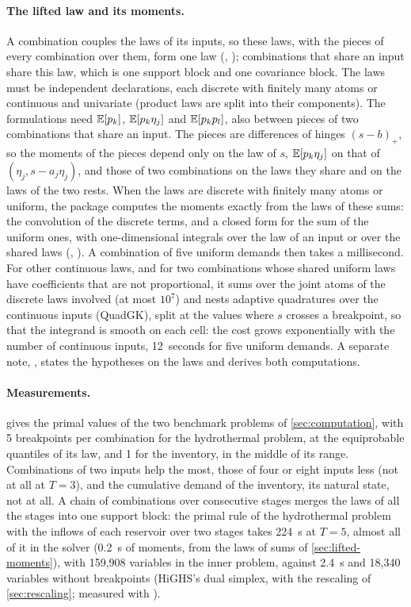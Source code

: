 \paragraph{The lifted law and its moments.}
A combination couples the laws of its inputs, so these laws, with the pieces of every combination over them, form one law
(, );
combinations that share an input share this law, which is one support block and one covariance block.
The laws must be independent declarations, each discrete with finitely many atoms or continuous and univariate (product laws are split into their components).
The formulations need $\mathbb{E}[p_k]$, $\mathbb{E}[p_k\eta_j]$ and $\mathbb{E}[p_kp_l]$, also between pieces of two combinations that share an input.
The pieces are differences of hinges $(s - b)_+$, so the moments of the pieces depend only on the law of $s$,
$\mathbb{E}[p_k\eta_j]$ on that of $(\eta_j, s - a_j\eta_j)$, and those of two combinations on the laws they share and on the laws of the two rests.
When the laws are discrete with finitely many atoms or uniform, the package computes the moments exactly from the laws of these sums:
the convolution of the discrete terms, and a closed form for the sum of the uniform ones,
with one-dimensional integrals over the law of an input or over the shared laws
(, ).
A combination of five uniform demands then takes a millisecond.
For other continuous laws, and for two combinations whose shared uniform laws have coefficients that are not proportional,
it sums over the joint atoms of the discrete laws involved (at most $10^7$)
and nests adaptive quadratures over the continuous inputs (QuadGK),
split at the values where $s$ crosses a breakpoint, so that the integrand is smooth on each cell:
the cost grows exponentially with the number of continuous inputs, 12~seconds for five uniform demands.
A separate note, , states the hypotheses on the laws and derives both computations.

\paragraph{Measurements.}
 gives the primal values of the two benchmark problems of \cref{sec:computation},
with 5 breakpoints per combination for the hydrothermal problem, at the equiprobable quantiles of its law,
and 1 for the inventory, in the middle of its range.
Combinations of two inputs help the most, those of four or eight inputs less (not at all at $T = 3$),
and the cumulative demand of the inventory, its natural state, not at all.
A chain of combinations over consecutive stages merges the laws of all the stages into one support block:
the primal rule of the hydrothermal problem with the inflows of each reservoir over two stages takes 224~s at $T = 5$,
almost all of it in the solver (0.2~s of moments, from the laws of sums of \cref{sec:lifted-moments}), with 159,908 variables in the inner problem,
against 2.4~s and 18,340 variables without breakpoints
(HiGHS's dual simplex, with the rescaling of \cref{sec:rescaling}; measured with ).

